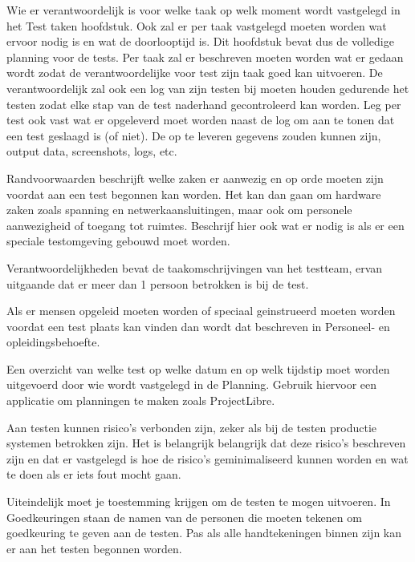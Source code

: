 Wie er verantwoordelijk is voor welke taak op welk moment wordt vastgelegd in het Test taken hoofdstuk. Ook zal er per taak vastgelegd moeten worden wat ervoor nodig is en wat de doorlooptijd is. Dit hoofdstuk bevat dus de volledige planning voor de tests. Per taak zal er beschreven moeten worden wat er gedaan wordt zodat de verantwoordelijke voor test zijn taak goed kan uitvoeren. De verantwoordelijk zal ook een log van zijn testen bij moeten houden gedurende het testen zodat elke stap van de test naderhand gecontroleerd kan worden. Leg per test ook vast wat er opgeleverd moet worden naast de log om aan te tonen dat een test geslaagd is (of niet). De op te leveren gegevens zouden kunnen zijn, output data, screenshots, logs, etc.

Randvoorwaarden beschrijft welke zaken er aanwezig en op orde moeten zijn voordat aan een test begonnen kan worden. Het kan dan gaan om hardware zaken zoals spanning en netwerkaansluitingen, maar ook om personele aanwezigheid of toegang tot ruimtes. Beschrijf hier ook wat er nodig is als er een speciale testomgeving gebouwd moet worden.

Verantwoordelijkheden bevat de taakomschrijvingen van het testteam, ervan uitgaande dat er meer dan 1 persoon betrokken is bij de test.

Als er mensen opgeleid moeten worden of speciaal geinstrueerd moeten worden voordat een test plaats kan vinden dan wordt dat beschreven in Personeel- en opleidingsbehoefte.

Een overzicht van welke test op welke datum en op welk tijdstip moet worden uitgevoerd door wie wordt vastgelegd in de Planning. Gebruik hiervoor een applicatie om planningen te maken zoals ProjectLibre.

Aan testen kunnen risico's verbonden zijn, zeker als bij de testen productie systemen betrokken zijn. Het is belangrijk belangrijk dat deze risico's beschreven zijn en dat er vastgelegd is hoe de risico's geminimaliseerd kunnen worden en wat te doen als er iets fout mocht gaan.

Uiteindelijk moet je toestemming krijgen om de testen te mogen uitvoeren. In Goedkeuringen staan de namen van de personen die moeten tekenen om goedkeuring te geven aan de testen. Pas als alle handtekeningen binnen zijn kan er aan het testen begonnen worden.
